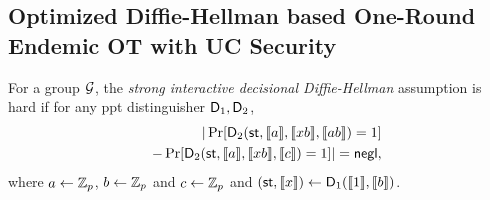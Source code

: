 \subsection{Optimized Diffie-Hellman based One-Round Endemic OT with UC Security }\label{sec:ddhProof}



\begin{definition}\label{def:SIDDH}
	For a group $\mathcal{G}$, the \emph{strong interactive decisional Diffie-Hellman} assumption is hard if for any ppt distinguisher $\mathsf D_1,\mathsf D_2$,
	\begin{eqnarray*}
		&&|\Pr[ \mathsf D_2(\mathsf{st},\llbracket a\rrbracket,\llbracket xb\rrbracket,\llbracket ab\rrbracket)=1]\\
		&&-\Pr[ \mathsf D_2(\mathsf{st},\llbracket a\rrbracket,\llbracket xb\rrbracket,\llbracket c\rrbracket)=1]|=\mathsf{negl},
	\end{eqnarray*}
	where $a\leftarrow\mathbb Z_p$, $b\leftarrow\mathbb Z_p$ and $c\leftarrow\mathbb Z_p$ and $(\mathsf{st},\llbracket x\rrbracket)\leftarrow\mathsf D_1(\llbracket 1\rrbracket,\llbracket b\rrbracket)$.
\end{definition}

